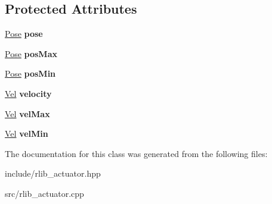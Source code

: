 \subsection*{Protected Attributes}
\begin{DoxyCompactItemize}
\item 
\hypertarget{classrlib_1_1Actuator_adcce3f106abc4127382d0d9794bb7b15}{\hyperlink{classrlib_1_1Pose}{Pose} {\bfseries pose}}\label{classrlib_1_1Actuator_adcce3f106abc4127382d0d9794bb7b15}

\item 
\hypertarget{classrlib_1_1Actuator_ae0dd994c7e78e9db5580ea23d1361f4e}{\hyperlink{classrlib_1_1Pose}{Pose} {\bfseries pos\-Max}}\label{classrlib_1_1Actuator_ae0dd994c7e78e9db5580ea23d1361f4e}

\item 
\hypertarget{classrlib_1_1Actuator_a4ab8363fb4cfe849f1bb89720387d222}{\hyperlink{classrlib_1_1Pose}{Pose} {\bfseries pos\-Min}}\label{classrlib_1_1Actuator_a4ab8363fb4cfe849f1bb89720387d222}

\item 
\hypertarget{classrlib_1_1Actuator_a27372af2dd629e7b434eb541de0a13a8}{\hyperlink{classrlib_1_1Vel}{Vel} {\bfseries velocity}}\label{classrlib_1_1Actuator_a27372af2dd629e7b434eb541de0a13a8}

\item 
\hypertarget{classrlib_1_1Actuator_a54b50a2b0f4cb61a4e5c70fa72a126dc}{\hyperlink{classrlib_1_1Vel}{Vel} {\bfseries vel\-Max}}\label{classrlib_1_1Actuator_a54b50a2b0f4cb61a4e5c70fa72a126dc}

\item 
\hypertarget{classrlib_1_1Actuator_ad8d95d72f27494890e16ed4ab6045f20}{\hyperlink{classrlib_1_1Vel}{Vel} {\bfseries vel\-Min}}\label{classrlib_1_1Actuator_ad8d95d72f27494890e16ed4ab6045f20}

\end{DoxyCompactItemize}


The documentation for this class was generated from the following files\-:\begin{DoxyCompactItemize}
\item 
include/rlib\-\_\-actuator.\-hpp\item 
src/rlib\-\_\-actuator.\-cpp\end{DoxyCompactItemize}
